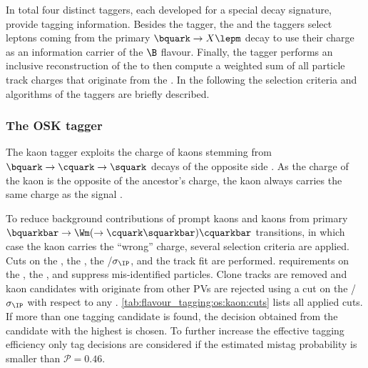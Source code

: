 In total four distinct \OS taggers, each developed for a special \OS decay
signature, provide tagging information. Besides the \OSK tagger, the \OSe and
the \OSm taggers select leptons coming from the primary $\bquark \to X \lepm$
decay to use their charge as an information carrier of the $\B$ flavour.
Finally, the \OSvtx tagger performs an inclusive reconstruction of the \OS \SV
to then compute a weighted sum of all particle track charges that originate from
the \SV. In the following the selection criteria and algorithms of the \OS
taggers are briefly described.

 
\subsubsection{The \acl{OSK} tagger}
\label{sec:flavour_tagging:os:kaon}

The kaon tagger exploits the charge of kaons stemming from $\bquark \to
\cquark \to \squark$ decays of the opposite side \bhadron. As the charge of the
kaon is the opposite of the ancestor's charge, the kaon always carries the same
charge as the signal \Bmeson. 

To reduce background contributions of prompt kaons and kaons from primary
$\bquarkbar \to \Wm (\to \cquark \squarkbar) \cquarkbar$ transitions, in which
case the kaon carries the \enquote{wrong} charge, several selection criteria are
applied. Cuts on the \pT, the \IP, the \IP/$\sigma_\text{\IP}$, and the track
fit \chisqndf are performed. \PID requirements on the \DLLKpi, the \DLLppi, and
\DLLmupi suppress mis-identified particles. Clone tracks are removed and kaon
candidates with originate from other \acp{PV} are rejected using a cut on the
\IP/$\sigma_\text{\IP}$ with respect to any \PV.
\cref{tab:flavour_tagging:os:kaon:cuts} lists all applied cuts. If more than one
tagging candidate is found, the decision obtained from the candidate with the
highest \pT is chosen. To further increase the effective tagging efficiency only
tag decisions are considered if the estimated mistag probability is smaller than
$\mathcal{P}=0.46$.

